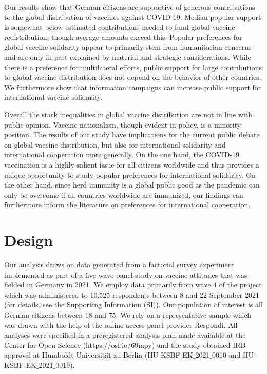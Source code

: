\documentclass[]{article}
\begin{document}
Our results show that  German citizens are supportive of generous contributions to the global distribution of vaccines against COVID-19. Median popular support is somewhat below estimated contributions needed to fund global vaccine redistribution; though average amounts exceed this. Popular preferences for global vaccine solidarity  appear to primarily stem from humanitarian concerns and are only in part explained by material and strategic considerations. While there is a preference for multilateral efforts, public support for large contributions to global vaccine distribution does not depend  on the behavior of other countries. We furthermore show that information campaigns can increase public support for international vaccine solidarity. 

Overall the stark inequalities in global vaccine distribution are not in line with public opinion. Vaccine nationalism, though evident in policy, is a minority position. The results of our study have implications for the current public debate on global vaccine distribution, but also for international solidarity and international cooperation more generally. On the one hand, the COVID-19 vaccination is a highly salient issue for all citizens worldwide and thus provides a unique opportunity to study popular preferences for international solidarity. On the other hand, since herd immunity is a global public good as the pandemic can only be overcome if all countries worldwide are immunized, our findings can furthermore inform the literature on preferences for international cooperation. 





\section{Design}
\label{sec:design}


Our analysis draws on data generated from a factorial survey experiment implemented as part of a five-wave panel study on vaccine attitudes that was fielded in Germany in 2021. We employ data primarily from wave 4 of the project which was administered to 10,525 respondents between 8 and 22 September 2021 (for details, see the Supporting Information (SI)). Our population of interest is all German citizens between 18 and 75. We rely on a representative sample which was drawn with the help of the online-access panel provider \hspace{0pt}Respondi\hspace{0pt}\hspace{0pt}. All analyses were specified in a preregistered analysis plan made available at the Center for Open Science (https://osf.io/69mpy) and the study obtained IRB approval at Humboldt-Universität zu Berlin (HU-KSBF-EK$\_$2021$\_$0010 and HU-KSBF-EK$\_$2021$\_$0019).
\end{document}
